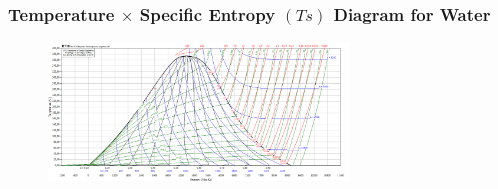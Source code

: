 \documentclass[10pt,compress,unknownkeysallowed]{beamer}
\begin{document}

\begin{frame}
 \frametitle{Temperature $\times$ Specific Entropy $(Ts)$ Diagram for Water}
  \begin{center}
   \begin{figure}
     \includegraphics[width=8cm,height=7.cm,clip]{../Pics/water_TS.png}
   \end{figure}
   \end{center}
\end{frame}
\end{document}
